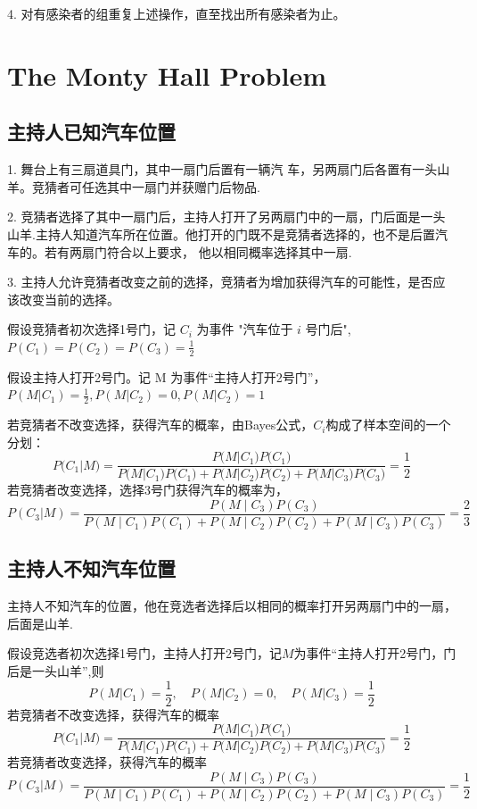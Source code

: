\documentclass[10t, a4paper, oneside]{ctexbook}
\begin{document}
4. 对有感染者的组重复上述操作，直至找出所有感染者为止。
\section{The Monty Hall Problem}
\subsection{主持人已知汽车位置}
1. 舞台上有三扇道具门，其中一扇门后置有一辆汽 车，另两扇门后各置有一头山羊。竞猜者可任选其中一扇门并获赠门后物品.

2. 竞猜者选择了其中一扇门后，主持人打开了另两扇门中的一扇，门后面是一头山羊.主持人知道汽车所在位置。他打开的门既不是竞猜者选择的，也不是后置汽车的。若有两扇门符合以上要求， 他以相同概率选择其中一扇.

3. 主持人允许竞猜者改变之前的选择，竞猜者为增加获得汽车的可能性，是否应该改变当前的选择。

假设竞猜者初次选择1号门，记 $C_i$ 为事件 "汽车位于 $i$ 号门后",$P(C_1)=P(C_2)=P(C_3)=\frac12$

假设主持人打开2号门。记 M 为事件“主持人打开2号门”， $P(M|C_1)= \frac12, P(M|C_2) = 0, P(M|C_2)= 1$

若竞猜者不改变选择，获得汽车的概率，由Bayes公式，$C_i$构成了样本空间的一个分划：
$$P\big(C_1|M\big)=\frac{P\big(M|C_1\big)P\big(C_1\big)}{P\big(M|C_1\big)P\big(C_1\big)+P\big(M|C_2\big)P\big(C_2\big)+P\big(M|C_3\big)P\big(C_3\big)} = \frac12$$
若竞猜者改变选择，选择3号门获得汽车的概率为，
$$P\left(C_{3}|M\right)={\frac{P\left(M\mid C_{3}\right)P\left(C_{3}\right)}{P\left(M\mid C_{1}\right)P\left(C_{1}\right)+P\left(M\mid C_{2}\right)P\left(C_{2}\right)+P\left(M\mid C_{3}\right)P\left(C_{3}\right)}}=\frac23$$
\subsection{主持人不知汽车位置}
主持人不知汽车的位置，他在竞选者选择后以相同的概率打开另两扇门中的一扇，后面是山羊.

假设竞选者初次选择1号门，主持人打开2号门，记$M$为事件“主持人打开2号门，门后是一头山羊”,则$$P(M|C_1) = \frac12, \quad P(M|C_2) = 0, \quad P(M|C_3) = \frac{1}{2}$$
若竞猜者不改变选择，获得汽车的概率
$$P\big(C_1|M\big)=\frac{P\big(M|C_1\big)P\big(C_1\big)}{P\big(M|C_1\big)P\big(C_1\big)+P\big(M|C_2\big)P\big(C_2\big)+P\big(M|C_3\big)P\big(C_3\big)} = \frac12$$
若竞猜者改变选择，获得汽车的概率
$$P\left(C_{3}|M\right)={\frac{P\left(M\mid C_{3}\right)P\left(C_{3}\right)}{P\left(M\mid C_{1}\right)P\left(C_{1}\right)+P\left(M\mid C_{2}\right)P\left(C_{2}\right)+P\left(M\mid C_{3}\right)P\left(C_{3}\right)}}=\frac12$$
\end{document}
